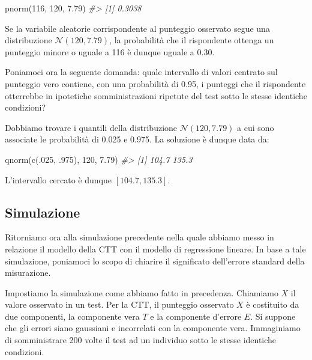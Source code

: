 \documentclass[
  11pt,
]{krantz}
\makeatletter
\newenvironment{Shaded}{\begin{snugshade}}{\end{snugshade}}
\newcommand{\CommentTok}[1]{\textcolor[rgb]{0.37,0.37,0.37}{\textit{#1}}}
\newcommand{\DecValTok}[1]{\textcolor[rgb]{0.06,0.06,0.06}{#1}}
\newcommand{\FloatTok}[1]{\textcolor[rgb]{0.06,0.06,0.06}{#1}}
\newcommand{\FunctionTok}[1]{\textcolor[rgb]{0,0,0}{#1}}
\newcommand{\NormalTok}[1]{#1}
\newenvironment{kframe}{%
\medskip{}
\setlength{\fboxsep}{.8em}
 \def\at@end@of@kframe{}%
 \ifinner\ifhmode%
  \def\at@end@of@kframe{\end{minipage}}%
  \begin{minipage}{\columnwidth}%
 \fi\fi%
 \def\FrameCommand##1{\hskip\@totalleftmargin \hskip-\fboxsep
 \colorbox{shadecolor}{##1}\hskip-\fboxsep
     \hskip-\linewidth \hskip-\@totalleftmargin \hskip\columnwidth}%
 \MakeFramed {\advance\hsize-\width
   \@totalleftmargin\z@ \linewidth\hsize
   \@setminipage}}%
 {\par\unskip\endMakeFramed%
 \at@end@of@kframe}
\renewenvironment{Shaded}{\begin{kframe}}{\end{kframe}}
\theoremstyle{definition}
\theoremstyle{definition}
\theoremstyle{definition}
\theoremstyle{definition}
\theoremstyle{remark}
\makeatother
\begin{document}
\begin{Shaded}
\begin{Highlighting}[]
\FunctionTok{pnorm}\NormalTok{(}\DecValTok{116}\NormalTok{, }\DecValTok{120}\NormalTok{, }\FloatTok{7.79}\NormalTok{)}
\CommentTok{\#\textgreater{} [1] 0.3038}
\end{Highlighting}
\end{Shaded}

Se la variabile aleatorie corrispondente al punteggio osservato segue una distribuzione \(\mathcal{N}(120, 7.79)\), la probabilità che il rispondente ottenga un punteggio minore o uguale a 116 è dunque uguale a 0.30.

Poniamoci ora la seguente domanda: quale intervallo di valori centrato sul punteggio vero contiene, con una probabilità di 0.95, i punteggi che il rispondente otterrebbe in ipotetiche somministrazioni ripetute del test sotto le stesse identiche condizioni?

Dobbiamo trovare i quantili della distribuzione \(\mathcal{N}(120, 7.79)\) a cui sono associate le probabilità di 0.025 e 0.975. La soluzione è dunque data da:

\begin{Shaded}
\begin{Highlighting}[]
\FunctionTok{qnorm}\NormalTok{(}\FunctionTok{c}\NormalTok{(.}\DecValTok{025}\NormalTok{, .}\DecValTok{975}\NormalTok{), }\DecValTok{120}\NormalTok{, }\FloatTok{7.79}\NormalTok{)}
\CommentTok{\#\textgreater{} [1] 104.7 135.3}
\end{Highlighting}
\end{Shaded}

L'intervallo cercato è dunque \([104.7, 135.3]\).

\hypertarget{simulazione-1}{%
\subsection{Simulazione}\label{simulazione-1}}

Ritorniamo ora alla simulazione precedente nella quale abbiamo messo in relazione il modello della CTT con il modello di regressione lineare. In base a tale simulazione, poniamoci lo scopo di chiarire il significato dell'errore standard della misurazione.

Impostiamo la simulazione come abbiamo fatto in precedenza. Chiamiamo \(X\) il valore osservato in un test. Per la CTT, il punteggio osservato \(X\) è costituito da due componenti, la componente vera \(T\) e la componente d'errore \(E\). Si suppone che gli errori siano gaussiani e incorrelati con la componente vera. Immaginiamo di somministrare 200 volte il test ad un individuo sotto le stesse identiche condizioni.
\end{document}
